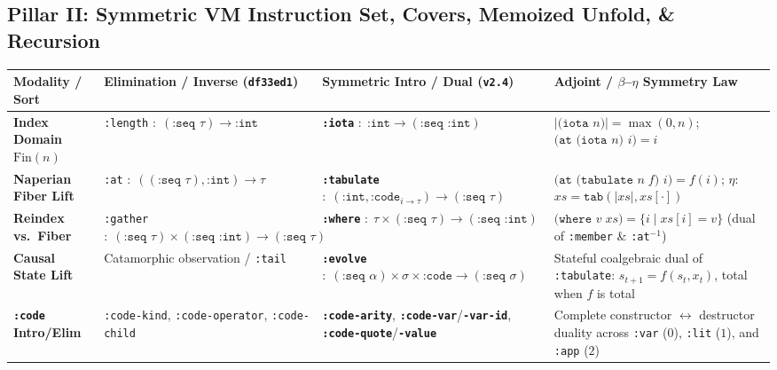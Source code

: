 \documentclass[12pt]{article}
\begin{document}
\subsection{Pillar II: Symmetric VM Instruction Set, Covers, Memoized Unfold, \& Recursion}
\label{sec:arch-covers}

\begin{table}[htbp]
\centering
\footnotesize
\setlength{\tabcolsep}{3.6pt}
\begin{tabular}{@{}L{2.55cm}L{3.55cm}L{4.25cm}L{5.25cm}@{}}
\toprule
\textbf{Modality / Sort} & \textbf{Elimination / Inverse (\texttt{df33ed1})} & \textbf{Symmetric Intro / Dual (\texttt{v2.4})} & \textbf{Adjoint / $\beta$--$\eta$ Symmetry Law} \\
\midrule
\textbf{Index Domain $\mathrm{Fin}(n)$} & \texttt{:length} $:\; (\texttt{:seq }\tau) \to \texttt{:int}$ & \textbf{\texttt{:iota}} $:\; \texttt{:int} \to (\texttt{:seq :int})$ & $|\texttt{(iota }n\texttt{)}| = \max(0,n)$;\; $\texttt{(at (iota }n\texttt{) }i\texttt{)} = i$ \\
\addlinespace[2pt]
\textbf{Naperian Fiber Lift} & \texttt{:at} $:\; ((\texttt{:seq }\tau),\texttt{:int}) \to \tau$ & \textbf{\texttt{:tabulate}} $:\; (\texttt{:int}, \texttt{:code}_{i\to\tau}) \to (\texttt{:seq }\tau)$ & $\texttt{(at (tabulate }n\;f\texttt{) }i\texttt{)} = f(i)$;\; $\eta$: $xs = \texttt{tab}(|xs|, xs[\cdot])$ \\
\addlinespace[2pt]
\textbf{Reindex vs.\ Fiber} & \texttt{:gather} $:\; (\texttt{:seq }\tau)\times(\texttt{:seq :int}) \allowbreak\to (\texttt{:seq }\tau)$ & \textbf{\texttt{:where}} $:\; \tau\times(\texttt{:seq }\tau) \allowbreak\to (\texttt{:seq :int})$ & $\texttt{(where }v\;xs\texttt{)} = \{i \mid xs[i]=v\}$ (dual of \texttt{:member} \& \texttt{:at}$^{-1}$) \\
\addlinespace[2pt]
\textbf{Causal State Lift} & Catamorphic observation / \texttt{:tail} & \textbf{\texttt{:evolve}} $:\; (\texttt{:seq }\alpha)\times\sigma\times\texttt{:code} \allowbreak\to (\texttt{:seq }\sigma)$ & Stateful coalgebraic dual of \texttt{:tabulate}: $s_{t+1} = f(s_t, x_t)$, total when $f$ is total \\
\addlinespace[2pt]
\textbf{\texttt{:code} Intro/Elim} & \texttt{:code-kind}, \texttt{:code-\allowbreak operator}, \texttt{:code-child} & \textbf{\texttt{:code-arity}}, \textbf{\texttt{:code-var}}/\allowbreak\textbf{\texttt{-var-id}}, \textbf{\texttt{:code-quote}}/\allowbreak\textbf{\texttt{-value}} & Complete constructor $\leftrightarrow$ destructor duality across \texttt{:var} ($0$), \texttt{:lit} ($1$), and \texttt{:app} ($2$) \\

\end{tabular}
\end{table}
\end{document}
